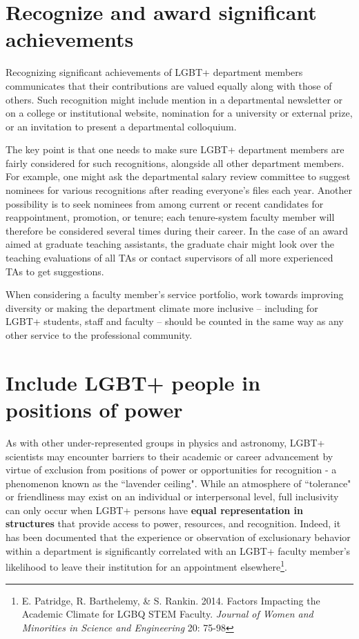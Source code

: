 \section {Recognize and award significant achievements}
\label{recognize-achievements}
Recognizing significant achievements of LGBT+ department members communicates that their contributions are valued equally along with those of others. Such recognition might include mention in a departmental newsletter or on a college or institutional website, nomination for a university or external prize, or an invitation to present a departmental colloquium.

The key point is that one needs to make sure LGBT+ department members are fairly considered for such recognitions, alongside all other department members. For example, one might ask the departmental salary review committee to suggest nominees for various recognitions after reading everyone's files each year. Another possibility is to seek nominees from among current or recent candidates for reappointment, promotion, or tenure; each tenure-system faculty member will therefore be considered several times during their career. In the case of an award aimed at graduate teaching assistants, the graduate chair might look over the teaching evaluations of all TAs or contact supervisors of all more experienced TAs to get suggestions.

When considering a faculty member's service portfolio, work towards improving diversity or making the department climate more inclusive -- including for LGBT+ students, staff and faculty -- should be counted in the same way as any other service to the professional community.


\section {Include LGBT+ people in positions of power}
\label{positions-of-power}
As with other under-represented groups in physics and astronomy, LGBT+ scientists may encounter barriers to their academic or career advancement by virtue of exclusion from positions of power or opportunities for recognition - a phenomenon known as the ``lavender ceiling". While an atmosphere of ``tolerance" or friendliness may exist on an individual or interpersonal level, full inclusivity can only occur when LGBT+ persons have \textbf{equal representation in structures} that provide access to power, resources, and recognition. Indeed, it has been documented that the experience or observation of exclusionary behavior within a department is significantly correlated with an LGBT+ faculty member's likelihood to leave their institution for an appointment elsewhere\footnote{E. Patridge, R. Barthelemy, \& S. Rankin. 2014. Factors Impacting the Academic Climate for LGBQ STEM Faculty. {\em Journal of Women and Minorities in Science and Engineering}\/ 20: 75-98}.

